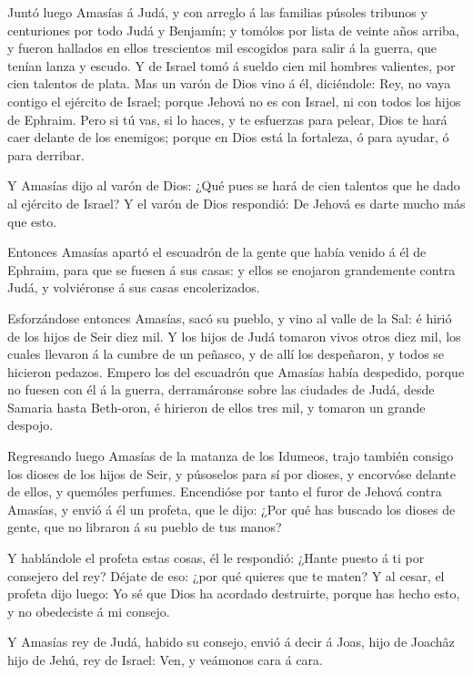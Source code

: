  Juntó luego Amasías á Judá, y con arreglo á las familias
púsoles tribunos y centuriones por todo Judá y Benjamín; y tomólos por
lista de veinte años arriba, y fueron hallados en ellos trescientos mil
escogidos para salir á la guerra, que tenían lanza y escudo.
 Y de Israel tomó á sueldo cien mil hombres valientes, por
cien talentos de plata.  Mas un varón de Dios vino á él,
diciéndole: Rey, no vaya contigo el ejército de Israel; porque Jehová no
es con Israel, ni con todos los hijos de Ephraim.  Pero si
tú vas, si lo haces, y te esfuerzas para pelear, Dios te hará caer
delante de los enemigos; porque en Dios está la fortaleza, ó para
ayudar, ó para derribar.

 Y Amasías dijo al varón de Dios: ¿Qué pues se hará de cien
talentos que he dado al ejército de Israel? Y el varón de Dios
respondió: De Jehová es darte mucho más que esto.

 Entonces Amasías apartó el escuadrón de la gente que había
venido á él de Ephraim, para que se fuesen á sus casas: y ellos se
enojaron grandemente contra Judá, y volviéronse á sus casas
encolerizados.

 Esforzándose entonces Amasías, sacó su pueblo, y vino al
valle de la Sal: é hirió de los hijos de Seir diez mil.  Y
los hijos de Judá tomaron vivos otros diez mil, los cuales llevaron á la
cumbre de un peñasco, y de allí los despeñaron, y todos se hicieron
pedazos.  Empero los del escuadrón que Amasías había
despedido, porque no fuesen con él á la guerra, derramáronse sobre las
ciudades de Judá, desde Samaria hasta Beth-oron, é hirieron de ellos
tres mil, y tomaron un grande despojo.

 Regresando luego Amasías de la matanza de los Idumeos,
trajo también consigo los dioses de los hijos de Seir, y púsoselos para
sí por dioses, y encorvóse delante de ellos, y quemóles perfumes.
 Encendióse por tanto el furor de Jehová contra Amasías, y
envió á él un profeta, que le dijo: ¿Por qué has buscado los dioses de
gente, que no libraron á su pueblo de tus manos?

 Y hablándole el profeta estas cosas, él le respondió:
¿Hante puesto á ti por consejero del rey? Déjate de eso: ¿por qué
quieres que te maten? Y al cesar, el profeta dijo luego: Yo sé que Dios
ha acordado destruirte, porque has hecho esto, y no obedeciste á mi
consejo.

 Y Amasías rey de Judá, habido su consejo, envió á decir á
Joas, hijo de Joachâz hijo de Jehú, rey de Israel: Ven, y veámonos cara
á cara.

